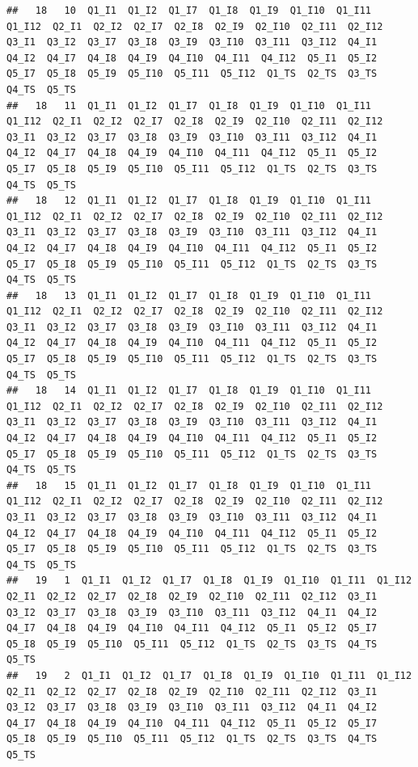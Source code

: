 \documentclass[]{book}
\begin{document}
\begin{verbatim}
##   18   10  Q1_I1  Q1_I2  Q1_I7  Q1_I8  Q1_I9  Q1_I10  Q1_I11  Q1_I12  Q2_I1  Q2_I2  Q2_I7  Q2_I8  Q2_I9  Q2_I10  Q2_I11  Q2_I12  Q3_I1  Q3_I2  Q3_I7  Q3_I8  Q3_I9  Q3_I10  Q3_I11  Q3_I12  Q4_I1  Q4_I2  Q4_I7  Q4_I8  Q4_I9  Q4_I10  Q4_I11  Q4_I12  Q5_I1  Q5_I2  Q5_I7  Q5_I8  Q5_I9  Q5_I10  Q5_I11  Q5_I12  Q1_TS  Q2_TS  Q3_TS  Q4_TS  Q5_TS
##   18   11  Q1_I1  Q1_I2  Q1_I7  Q1_I8  Q1_I9  Q1_I10  Q1_I11  Q1_I12  Q2_I1  Q2_I2  Q2_I7  Q2_I8  Q2_I9  Q2_I10  Q2_I11  Q2_I12  Q3_I1  Q3_I2  Q3_I7  Q3_I8  Q3_I9  Q3_I10  Q3_I11  Q3_I12  Q4_I1  Q4_I2  Q4_I7  Q4_I8  Q4_I9  Q4_I10  Q4_I11  Q4_I12  Q5_I1  Q5_I2  Q5_I7  Q5_I8  Q5_I9  Q5_I10  Q5_I11  Q5_I12  Q1_TS  Q2_TS  Q3_TS  Q4_TS  Q5_TS
##   18   12  Q1_I1  Q1_I2  Q1_I7  Q1_I8  Q1_I9  Q1_I10  Q1_I11  Q1_I12  Q2_I1  Q2_I2  Q2_I7  Q2_I8  Q2_I9  Q2_I10  Q2_I11  Q2_I12  Q3_I1  Q3_I2  Q3_I7  Q3_I8  Q3_I9  Q3_I10  Q3_I11  Q3_I12  Q4_I1  Q4_I2  Q4_I7  Q4_I8  Q4_I9  Q4_I10  Q4_I11  Q4_I12  Q5_I1  Q5_I2  Q5_I7  Q5_I8  Q5_I9  Q5_I10  Q5_I11  Q5_I12  Q1_TS  Q2_TS  Q3_TS  Q4_TS  Q5_TS
##   18   13  Q1_I1  Q1_I2  Q1_I7  Q1_I8  Q1_I9  Q1_I10  Q1_I11  Q1_I12  Q2_I1  Q2_I2  Q2_I7  Q2_I8  Q2_I9  Q2_I10  Q2_I11  Q2_I12  Q3_I1  Q3_I2  Q3_I7  Q3_I8  Q3_I9  Q3_I10  Q3_I11  Q3_I12  Q4_I1  Q4_I2  Q4_I7  Q4_I8  Q4_I9  Q4_I10  Q4_I11  Q4_I12  Q5_I1  Q5_I2  Q5_I7  Q5_I8  Q5_I9  Q5_I10  Q5_I11  Q5_I12  Q1_TS  Q2_TS  Q3_TS  Q4_TS  Q5_TS
##   18   14  Q1_I1  Q1_I2  Q1_I7  Q1_I8  Q1_I9  Q1_I10  Q1_I11  Q1_I12  Q2_I1  Q2_I2  Q2_I7  Q2_I8  Q2_I9  Q2_I10  Q2_I11  Q2_I12  Q3_I1  Q3_I2  Q3_I7  Q3_I8  Q3_I9  Q3_I10  Q3_I11  Q3_I12  Q4_I1  Q4_I2  Q4_I7  Q4_I8  Q4_I9  Q4_I10  Q4_I11  Q4_I12  Q5_I1  Q5_I2  Q5_I7  Q5_I8  Q5_I9  Q5_I10  Q5_I11  Q5_I12  Q1_TS  Q2_TS  Q3_TS  Q4_TS  Q5_TS
##   18   15  Q1_I1  Q1_I2  Q1_I7  Q1_I8  Q1_I9  Q1_I10  Q1_I11  Q1_I12  Q2_I1  Q2_I2  Q2_I7  Q2_I8  Q2_I9  Q2_I10  Q2_I11  Q2_I12  Q3_I1  Q3_I2  Q3_I7  Q3_I8  Q3_I9  Q3_I10  Q3_I11  Q3_I12  Q4_I1  Q4_I2  Q4_I7  Q4_I8  Q4_I9  Q4_I10  Q4_I11  Q4_I12  Q5_I1  Q5_I2  Q5_I7  Q5_I8  Q5_I9  Q5_I10  Q5_I11  Q5_I12  Q1_TS  Q2_TS  Q3_TS  Q4_TS  Q5_TS
##   19   1  Q1_I1  Q1_I2  Q1_I7  Q1_I8  Q1_I9  Q1_I10  Q1_I11  Q1_I12  Q2_I1  Q2_I2  Q2_I7  Q2_I8  Q2_I9  Q2_I10  Q2_I11  Q2_I12  Q3_I1  Q3_I2  Q3_I7  Q3_I8  Q3_I9  Q3_I10  Q3_I11  Q3_I12  Q4_I1  Q4_I2  Q4_I7  Q4_I8  Q4_I9  Q4_I10  Q4_I11  Q4_I12  Q5_I1  Q5_I2  Q5_I7  Q5_I8  Q5_I9  Q5_I10  Q5_I11  Q5_I12  Q1_TS  Q2_TS  Q3_TS  Q4_TS  Q5_TS
##   19   2  Q1_I1  Q1_I2  Q1_I7  Q1_I8  Q1_I9  Q1_I10  Q1_I11  Q1_I12  Q2_I1  Q2_I2  Q2_I7  Q2_I8  Q2_I9  Q2_I10  Q2_I11  Q2_I12  Q3_I1  Q3_I2  Q3_I7  Q3_I8  Q3_I9  Q3_I10  Q3_I11  Q3_I12  Q4_I1  Q4_I2  Q4_I7  Q4_I8  Q4_I9  Q4_I10  Q4_I11  Q4_I12  Q5_I1  Q5_I2  Q5_I7  Q5_I8  Q5_I9  Q5_I10  Q5_I11  Q5_I12  Q1_TS  Q2_TS  Q3_TS  Q4_TS  Q5_TS

\end{verbatim}
\end{document}
